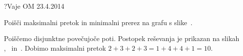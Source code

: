 \begin{naloga}{?}{Vaje OM 23.4.2014}
\begin{vprasanje}
Poišči maksimalni pretok in minimalni prerez na grafu s slike~\fig{}.

\begin{slika}
\pgfslika
{}
\end{slika}
\end{vprasanje}

\begin{odgovor}
Poiščemo disjunktne povečujoče poti.
Postopek reševanja je prikazan na slikah~%
,~ in~.
Dobimo maksimalni pretok $2+3+2+3 = 1+4+4+1 = 10$.

\begin{slika}
\pgfslika[pretok2a]
\end{slika}
\begin{slika}
\pgfslika[pretok2b]
\end{slika}
\begin{slika}
\pgfslika[pretok2c]
\end{slika}
\end{odgovor}
\end{naloga}
